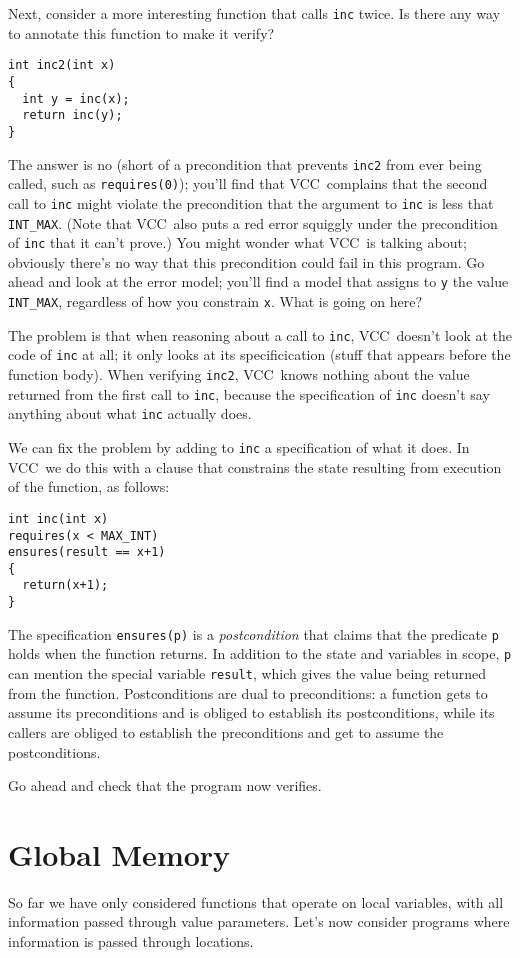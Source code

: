 \documentclass{report}
\newcommand{\Q}[1]{\lstinline~#1~}
\newcommand{\VCC}{VCC}
\newcommand{\Def}[1]{\emph{#1}}
\begin{document}
Next, consider a more interesting function that calls \Q{inc}
twice. Is there any way to annotate this function to make it verify?
\begin{lstlisting}
int inc2(int x)
{
  int y = inc(x);
  return inc(y);
}
\end{lstlisting}
The answer is no (short of a precondition that prevents \Q{inc2} from
ever being called, such as \Q{requires(0)}); you'll find that
\VCC\ complains that the second call to \Q{inc} might violate the
precondition that the argument to \Q{inc} is less that
\Q{INT_MAX}. (Note that \VCC\ also puts a red error squiggly under the
precondition of \Q{inc} that it can't prove.) You might wonder what
\VCC\ is talking about; obviously there's no way that this
precondition could fail in this program. Go ahead and look at the
error model; you'll find a model that assigns to \Q{y} the value
\Q{INT_MAX}, regardless of how you constrain \Q{x}. What is going on
here?

The problem is that when reasoning about a call to \Q{inc},
\VCC\ doesn't look at the code of \Q{inc} at all; it only looks at its
specificication (stuff that appears before the function body). When
verifying \Q{inc2}, \VCC\ knows nothing about the value returned from
the first call to \Q{inc}, because the specification of \Q{inc}
doesn't say anything about what \Q{inc} actually does.

We can fix the problem by adding to \Q{inc} a specification of what it
does. In \VCC\ we do this with a clause that constrains the state
resulting from execution of the function, as follows:
\begin{lstlisting}
int inc(int x)
requires(x < MAX_INT)
ensures(result == x+1)
{
  return(x+1);
}
\end{lstlisting}
The specification \Q{ensures(p)} is a \Def{postcondition} that claims
that the predicate \Q{p} holds when the function returns. In addition
to the state and variables in scope, \Q{p} can mention the special
variable \Q{result}, which gives the value being returned from the
function. 
Postconditions are dual to preconditions: a function gets to
assume its preconditions and is obliged to establish its
postconditions, while its callers are obliged to establish the
preconditions and get to assume the postconditions. 

Go ahead and check that the program now verifies.

\section{Global Memory}
So far we have only considered functions that operate on local variables,
with all information passed through value parameters. Let's now
consider programs where information is passed through locations.
\end{document}
